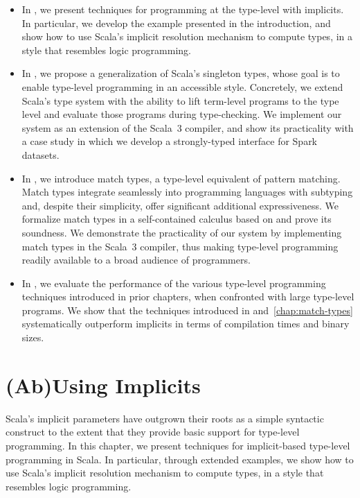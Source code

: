 \begin{itemize}
  \item In , we present techniques for programming at the type-level with implicits.
  In particular, we develop the example presented in the introduction, and show how to use Scala's implicit resolution mechanism to compute types, in a style that resembles logic programming.

  \item In , we propose a generalization of Scala's singleton types, whose goal is to enable type-level programming in an accessible style.
  Concretely, we extend Scala's type system with the ability to lift term-level programs to the type level and evaluate those programs during type-checking.
  We implement our system as an extension of the Scala~3 compiler, and show its practicality with a case study in which we develop a strongly-typed interface for Spark datasets.

  \item In , we introduce match types, a type-level equivalent of pattern matching.
  Match types integrate seamlessly into programming languages with subtyping and, despite their simplicity, offer significant additional expressiveness.
  We formalize match types in a self-contained calculus based on \SystemFsub and prove its soundness.
  We demonstrate the practicality of our system by implementing match types in the Scala~3 compiler, thus making type-level programming readily available to a broad audience of programmers.

  \item In , we evaluate the performance of the various type-level programming techniques introduced in prior chapters, when confronted with large type-level programs.
  We show that the techniques introduced in  and~\ref{chap:match-types} systematically outperform implicits in terms of compilation times and binary sizes.
\end{itemize}

\chapter{(Ab)Using Implicits}
\label{chap:ab-using-implicits}

Scala's implicit parameters have outgrown their roots as a simple syntactic construct to the extent that they provide basic support for type-level programming.
In this chapter, we present techniques for implicit-based type-level programming in Scala.
In particular, through extended examples, we show how to use Scala's implicit resolution mechanism to compute types, in a style that resembles logic programming.

